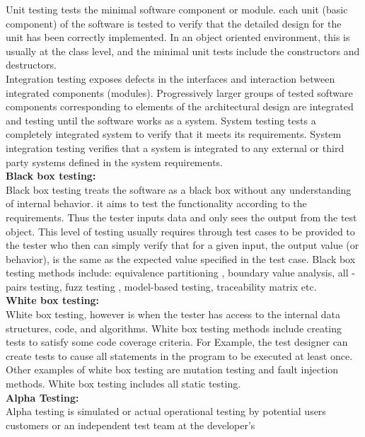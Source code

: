 \hspace*{0.82cm}Unit testing tests the minimal software component or module. each unit (basic component) of the software is tested 
to verify that the detailed design for the unit has been correctly implemented. In an object oriented environment, this is usually 
at the class level, and the minimal unit tests include the constructors and destructors.\\[0.5cm]
\hspace*{0.82cm}Integration testing exposes defects in the interfaces and interaction between integrated components (modules). 
Progressively larger groups of tested software components corresponding to elements of the architectural design are integrated and 
testing until the software works as a system. System testing tests a completely integrated system to verify that it meets its 
requirements. System integration testing verifies that a system is integrated to any external or third party systems defined in 
the system requirements.\\[0.5cm]
\textbf{Black box testing:}\\
\hspace*{0.82cm}Black box testing treats the software as a black box without any understanding of internal behavior. it aims to 
test the functionality according to the requirements. Thus the tester inputs data and only sees the output from the test object. 
This level of testing usually requires through test cases to be provided to the tester who then can simply verify that for a given 
input, the output value (or behavior), is the same as the expected value specified in the test case. Black box testing methods 
include: equivalence partitioning , boundary value analysis, all - pairs testing, fuzz testing , model-based testing, traceability 
matrix etc.\\[0.5cm]
\textbf{White box testing:}\\
\hspace*{0.82cm}White box testing, however is when the tester has access to the internal data structures, code, and algorithms. 
White box testing methods include creating tests to satisfy some code coverage criteria. For Example, the test designer can 
create tests to cause all statements in the program to be executed at least once. Other examples of white box testing are mutation 
testing and fault injection methods. White box testing includes all static testing.\\[0.5cm]
\textbf{Alpha Testing:}\\
Alpha testing is simulated or actual operational testing by potential users customers or an independent test team at the developer's 
